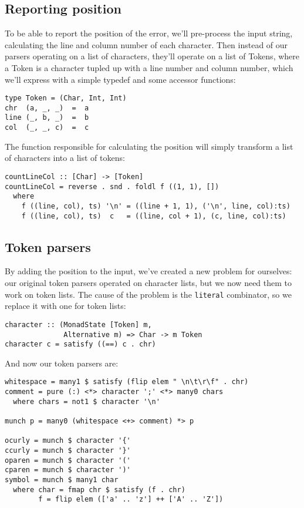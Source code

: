 \documentclass{tmr}
\begin{document}
\subsection{Reporting position}
To be able to report the position of the error, we'll pre-process the input
string, calculating the line and column number of each character.  Then instead 
of our parsers operating on a list of characters, they'll operate on a list of 
Tokens, where a Token is a character tupled up with a line number and column 
number, which we'll express with a simple typedef and some accessor functions:
\begin{verbatim}
type Token = (Char, Int, Int)
chr  (a, _, _)  =  a
line (_, b, _)  =  b
col  (_, _, c)  =  c
\end{verbatim}
The function responsible for calculating the position will simply transform a 
list of characters into a list of tokens:
\begin{verbatim}
countLineCol :: [Char] -> [Token]
countLineCol = reverse . snd . foldl f ((1, 1), [])
  where
    f ((line, col), ts) '\n' = ((line + 1, 1), ('\n', line, col):ts)
    f ((line, col), ts)  c   = ((line, col + 1), (c, line, col):ts)
\end{verbatim}

\subsection{Token parsers}
By adding the position to the input, we've created a new problem 
for ourselves: our original token parsers operated on 
character lists, but we now need them to work on token lists.  
The cause of the problem is the \verb+literal+ combinator, so we
replace it with one for token lists:
\begin{verbatim}
character :: (MonadState [Token] m, 
              Alternative m) => Char -> m Token
character c = satisfy ((==) c . chr)
\end{verbatim}

And now our token parsers are:
\begin{verbatim}
whitespace = many1 $ satisfy (flip elem " \n\t\r\f" . chr)
comment = pure (:) <*> character ';' <*> many0 chars
  where chars = not1 $ character '\n'

munch p = many0 (whitespace <+> comment) *> p

ocurly = munch $ character '{'
ccurly = munch $ character '}'
oparen = munch $ character '('
cparen = munch $ character ')'
symbol = munch $ many1 char
  where char = fmap chr $ satisfy (f . chr)
        f = flip elem (['a' .. 'z'] ++ ['A' .. 'Z'])
\end{verbatim}
\end{document}
